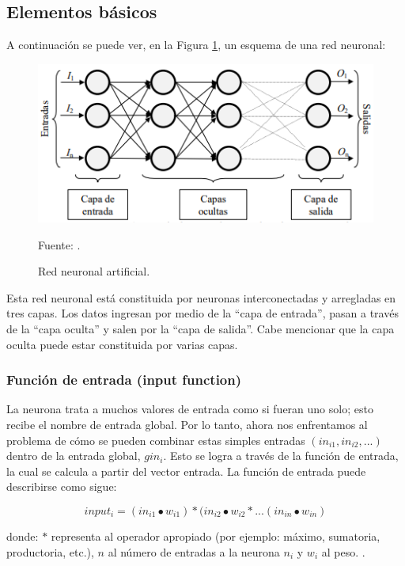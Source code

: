 \subsection{Elementos básicos}
A continuación se puede ver, en la Figura \ref{fig:rnaBasico}, un esquema de una red neuronal: 

\begin{figure}[h!]
	\centering
		\includegraphics[scale=0.8]{imagenes/rnaBasico.png}
		\caption{Red neuronal artificial.}
		\begin{center}
    Fuente: \cite{redneuronalimagen}.
    \end{center}
	\label{fig:rnaBasico}
\end{figure}

Esta red neuronal está constituida por neuronas interconectadas y arregladas en tres capas. Los datos ingresan por medio de la “capa de entrada”, pasan a través de la “capa oculta” y salen por la “capa de salida”. Cabe mencionar que la capa oculta puede estar constituida por varias capas.

\subsubsection{Función de entrada (input function)}
La neurona trata a muchos valores de entrada como si fueran uno solo; esto recibe el nombre de entrada global. Por lo tanto, ahora nos enfrentamos al problema de cómo se pueden combinar estas simples entradas $(in_{i1}, in_{i2}, ...)$ dentro de la entrada global, $gin_{i}$. Esto se logra a través de la función de entrada, la cual se calcula a partir del vector entrada. La función de entrada puede describirse como sigue:

\begin{equation}
input_{i}=(in_{i1} \bullet w_{i1})\ast (in_{i2} \bullet w_{i2} \ast ... (in_{in} \bullet w_{in})
\end{equation}

donde: $\ast$ representa al operador apropiado (por ejemplo: máximo, sumatoria, productoria, etc.), $n$ al número de entradas a la neurona $n_{i}$ y $w_{i}$ al peso. \citep{matich2001redes}.

